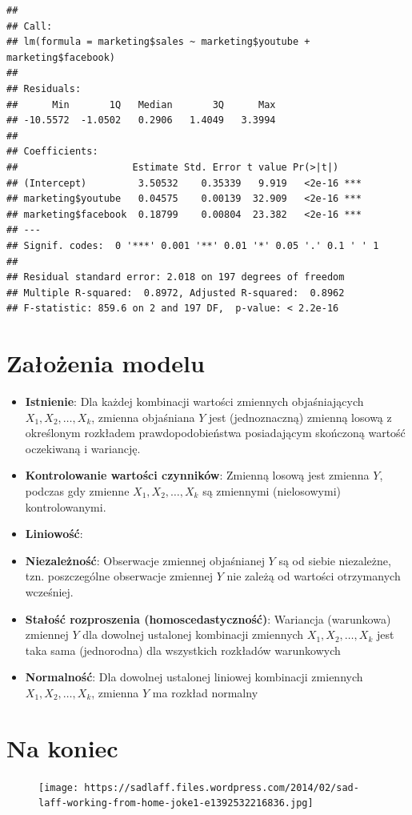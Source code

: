 \documentclass[]{article}
\begin{document}
\begin{verbatim}
## 
## Call:
## lm(formula = marketing$sales ~ marketing$youtube + marketing$facebook)
## 
## Residuals:
##      Min       1Q   Median       3Q      Max 
## -10.5572  -1.0502   0.2906   1.4049   3.3994 
## 
## Coefficients:
##                    Estimate Std. Error t value Pr(>|t|)    
## (Intercept)         3.50532    0.35339   9.919   <2e-16 ***
## marketing$youtube   0.04575    0.00139  32.909   <2e-16 ***
## marketing$facebook  0.18799    0.00804  23.382   <2e-16 ***
## ---
## Signif. codes:  0 '***' 0.001 '**' 0.01 '*' 0.05 '.' 0.1 ' ' 1
## 
## Residual standard error: 2.018 on 197 degrees of freedom
## Multiple R-squared:  0.8972, Adjusted R-squared:  0.8962 
## F-statistic: 859.6 on 2 and 197 DF,  p-value: < 2.2e-16
\end{verbatim}

\section{Założenia modelu}\label{zaozenia-modelu}

\begin{itemize}
\item
  \textbf{Istnienie}: Dla każdej kombinacji wartości zmiennych
  objaśniających \(X_1, X_2,\ldots, X_k\), zmienna objaśniana \(Y\) jest
  (jednoznaczną) zmienną losową z określonym rozkładem
  prawdopodobieństwa posiadającym skończoną wartość oczekiwaną i
  wariancję.
\item
  \textbf{Kontrolowanie wartości czynników}: Zmienną losową jest zmienna
  \(Y\), podczas gdy zmienne \(X_1, X_2,\ldots, X_k\) są zmiennymi
  (nielosowymi) kontrolowanymi.
\item
  \textbf{Liniowość}:
\item
  \textbf{Niezależność}: Obserwacje zmiennej objaśnianej \(Y\) są od
  siebie niezależne, tzn. poszczególne obserwacje zmiennej \(Y\) nie
  zależą od wartości otrzymanych wcześniej.
\item
  \textbf{Stałość rozproszenia (homoscedastyczność)}: Wariancja
  (warunkowa) zmiennej \(Y\) dla dowolnej ustalonej kombinacji zmiennych
  \(X_1, X_2,\ldots, X_k\) jest taka sama (jednorodna) dla wszystkich
  rozkładów warunkowych
\item
  \textbf{Normalność}: Dla dowolnej ustalonej liniowej kombinacji
  zmiennych \(X_1, X_2,\ldots, X_k\), zmienna \(Y\) ma rozkład normalny
\end{itemize}

\section{Na koniec}\label{na-koniec}

\begin{figure}
\centering
\texttt{[image: https://sadlaff.files.wordpress.com/2014/02/sad-laff-working-from-home-joke1-e1392532216836.jpg]}
\caption{}
\end{figure}
\end{document}
